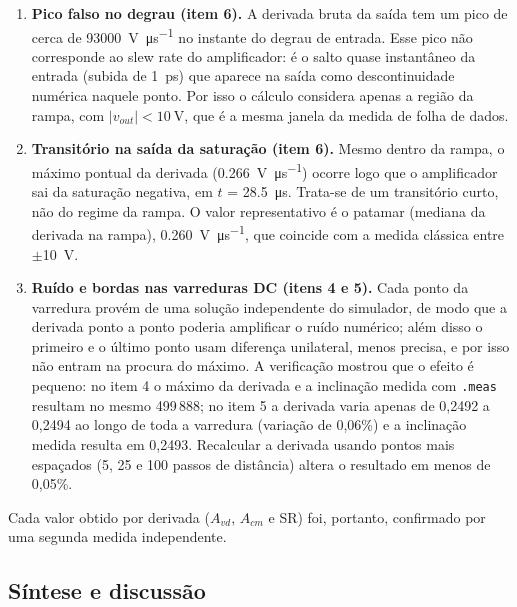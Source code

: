 \begin{enumerate}
  \item \textbf{Pico falso no degrau (item 6).} A derivada bruta da
        saída tem um pico de cerca de
        \SI{93000}{\volt\per\micro\second} no instante do degrau de
        entrada. Esse pico não corresponde ao slew rate do
        amplificador: é o salto quase instantâneo da entrada (subida de
        \SI{1}{\pico\second}) que aparece na saída como
        descontinuidade numérica naquele ponto.
        Por isso o cálculo considera apenas a região da rampa, com
        $|v_{out}| < \SI{10}{\volt}$, que é a mesma janela da medida de
        folha de dados.
  \item \textbf{Transitório na saída da saturação (item 6).} Mesmo
        dentro da rampa, o máximo pontual da derivada
        (\SI{0.266}{\volt\per\micro\second}) ocorre logo que o
        amplificador sai da saturação negativa, em $t$ =
        \SI{28.5}{\micro\second}. Trata-se de um transitório curto, não
        do regime da rampa. O valor representativo é o patamar (mediana da
        derivada na rampa), \SI{0.260}{\volt\per\micro\second}, que
        coincide com a medida clássica entre $\pm$\SI{10}{\volt}.
  \item \textbf{Ruído e bordas nas varreduras DC (itens 4 e 5).} Cada
        ponto da varredura provém de uma solução independente do
        simulador, de modo que a derivada ponto a ponto poderia
        amplificar o ruído numérico; além disso o primeiro e o último ponto usam
        diferença unilateral, menos precisa, e por isso não entram na
        procura do máximo. A verificação mostrou que o efeito é pequeno:
        no item 4 o máximo da derivada e a inclinação medida com
        \texttt{.meas} resultam no mesmo 499\,888; no item 5 a derivada
        varia apenas de 0,2492 a
        0,2494 ao longo de toda a varredura (variação de 0,06\%) e a
        inclinação medida resulta em 0,2493. Recalcular a derivada
        usando pontos mais espaçados (5, 25 e 100 passos de distância)
        altera o resultado em menos de 0,05\%.
\end{enumerate}

Cada valor obtido por derivada ($A_{vd}$, $A_{cm}$ e SR) foi, portanto,
confirmado por uma segunda medida independente.

\subsection{Síntese e discussão}


